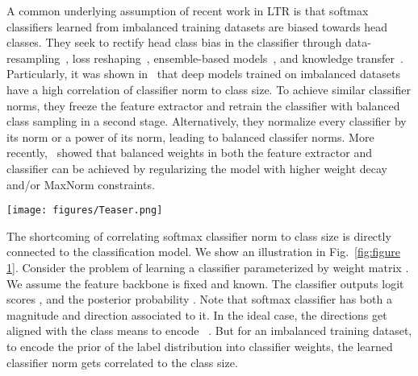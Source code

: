 \documentclass{article}
\begin{document}
A common underlying assumption of recent work in LTR is that softmax classifiers learned from imbalanced training datasets are biased towards head classes. They seek to rectify head class bias in the classifier through data-resampling~\cite{kang2019decoupling}, loss reshaping~\cite{ren2020balanced,menon2020long,samuel2021distributional}, ensemble-based models~\cite{xiang2020learning,wang2020long,zhou2020bbn}, and knowledge transfer~\cite{liu2019large,liu2021gistnet}. Particularly, it was shown in~\cite{kang2019decoupling} that deep models trained on imbalanced datasets have a high correlation of classifier norm to class size. To achieve similar classifier norms, they freeze the feature extractor and retrain the classifier with balanced class sampling in a second stage. Alternatively, they normalize every classifier by its  norm or a power of its norm, leading to balanced classifer norms. More recently,~\cite{alshammari2022long} showed that balanced weights in both the feature extractor and classifier can be achieved by regularizing the model with higher weight decay and/or MaxNorm constraints.  

\begin{figure*}[!ht]{}
    \texttt{[image: figures/Teaser.png]}
    \caption{An illustration of Softmax vs Prototype classifiers for long-tailed data. Softmax classifiers have both a direction and a magnitude, indicated by the orientation and length of the classifier vector. During imbalanced training, the length of softmax classifiers gets correlated to the class size and leads to classification boundaries biased towards classes with Many samples. In contrast, prototype classifiers circumvent this shortcoming by using Euclidean distances to learnable prototypes within representation space, leading to more fair decision boundaries.}
    \label{fig:figure 1}
\end{figure*}

The shortcoming of correlating softmax classifier norm to class size is directly connected to the classification model. We show an illustration in Fig.~\ref{fig:figure 1}. Consider the problem of learning a classifier  parameterized by weight matrix . We assume the feature backbone  is fixed and known. The classifier outputs logit scores , and the posterior probability . Note that softmax classifier has both a magnitude and direction associated to it. In the ideal case, the directions get aligned with the class means  to encode ~\cite{papyan2020prevalence,thrampoulidisimbalance}. But for an imbalanced training dataset, to encode the prior of the label distribution  into classifier weights, the learned classifier norm gets correlated to the class size.
\end{document}

